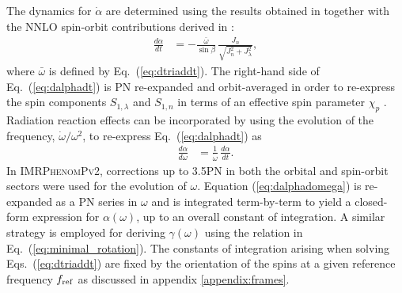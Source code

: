 \documentclass[%
aps,
prd,
amssymb,
amsmath,
amsfonts,
eqsecnum,
showpacs,
nofootinbib,
floatfix,
twocolumn,
twoside,
a4paper,
superscriptaddress
]{revtex4-1}
\newcommand{\n}{\newline}
\newcommand{\ppvtwo}{\textsc{IMRPhenomPv2}\xspace}
\begin{document}
The dynamics for $\dot{\alpha}$ are determined using the results obtained in \cite{Blanchet:2011zv} together with the NNLO spin-orbit contributions derived in \cite{Marsat:2013wwa}:
\begin{align}
    \label{eq:dalphadt}
    \frac{d \alpha}{d t} &= - \frac{\bar{\omega}}{\sin \beta} \, \frac{J_n}{\sqrt{J^2_n + J^2_{\lambda}}} , 
\end{align}
where $\bar{\omega}$ is defined by Eq.~(\ref{eq:dtriaddt}). The right-hand side of Eq.~(\ref{eq:dalphadt}) is PN re-expanded and orbit-averaged in order to re-express the spin components $S_{1,\lambda}$ and $S_{1,n}$ in terms of an effective spin parameter $\chi_p$ \cite{Schmidt:2014iyl}. Radiation reaction effects can be incorporated by using the evolution of the frequency, $\dot{\omega} / \omega^2$, to re-express Eq.~(\ref{eq:dalphadt}) as
\begin{align}
\label{eq:dalphadomega}
    \frac{d \alpha}{d \omega} &= \frac{1}{\dot{\omega}} \, \frac{d \alpha}{d t} .
\end{align}
In \ppvtwo, corrections up to 3.5PN in both the orbital and spin-orbit sectors were used for the evolution of $\omega$. Equation (\ref{eq:dalphadomega}) is re-expanded as a PN series in $\omega$ and is integrated term-by-term to yield a closed-form expression for $\alpha(\omega)$, up to an overall constant of integration. A similar strategy is employed for deriving $\gamma (\omega)$ using the relation in Eq.~(\ref{eq:minimal_rotation}).
The constants of integration arising when solving Eqs.~(\ref{eq:dtriaddt}) are fixed by the orientation of the spins at a given reference frequency $f_{\rm{ref}}$
as discussed in appendix \ref{appendix:frames}. 
\end{document}
